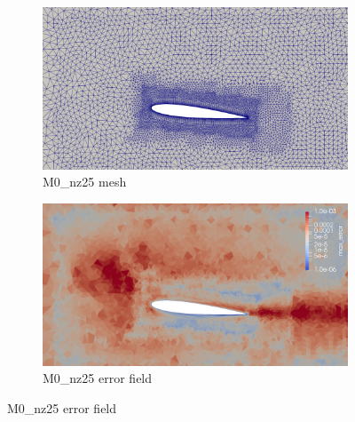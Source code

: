 \begin{figure}[H]
\centering

\begin{subfigure}[b]{0.475\textwidth}
\centering
\includegraphics[width=1\textwidth]{figures/zonal_adapt_results/Mesh_and_error_plots/M0_inplane.png}
\caption{M0\_nz25 mesh}
\label{fig:zonal_M0_mesh}
\end{subfigure}
\begin{subfigure}[b]{0.475\textwidth}
\centering
\includegraphics[width=1\textwidth]{figures/zonal_adapt_results/Mesh_and_error_plots/M0_error.png}
\caption{M0\_nz25 error field}
\label{fig:zonal_M0_error}
\end{subfigure}


\end{figure}
